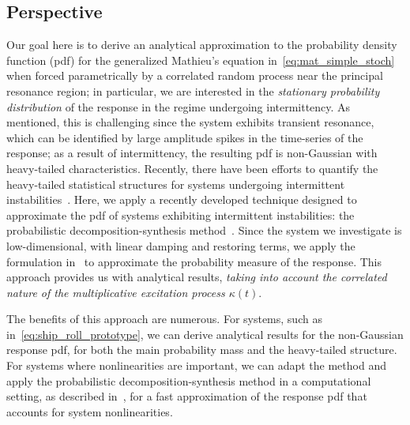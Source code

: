 \documentclass[3p]{elsarticle}
\begin{document}
\subsection{Perspective}
Our goal here is to derive an analytical approximation to the probability density function (pdf) for the generalized Mathieu's equation in~\cref{eq:mat_simple_stoch} when forced parametrically by a correlated random process near the principal resonance region; in particular, we are interested in   the \emph{stationary probability distribution} of the response in the regime undergoing intermittency. As mentioned, this is   challenging since the system exhibits transient  resonance, which can be identified by large amplitude spikes in the time-series of the response; as a result of intermittency, the resulting pdf is non-Gaussian with heavy-tailed characteristics.  Recently, there have been efforts to quantify the heavy-tailed statistical structures for systems undergoing intermittent instabilities~\cite{mohamad2015,mohamad2016, tong15,qi15}. Here,   we apply a recently developed technique  designed to  approximate the pdf of systems exhibiting intermittent instabilities:   the probabilistic decomposition-synthesis method~\cite{mohamad2016,mohamad2015}. Since the system we investigate is low-dimensional, with linear damping and restoring terms,  we  apply the formulation in~\cite{mohamad2015} to approximate the probability  measure of the response. This approach provides us with analytical results, \emph{taking into account the   correlated nature of the multiplicative excitation process $\kappa(t)$}. 

The benefits of this approach are numerous. For  systems, such as in~\cref{eq:ship_roll_prototype}, we can derive analytical results for the  non-Gaussian response pdf,   for both the main probability mass and the heavy-tailed structure.   For systems where nonlinearities are important, we can adapt the method and  apply the  probabilistic decomposition-synthesis method in a computational setting, as described in~\cite{mohamad2016}, for a fast approximation of the response pdf that  accounts for system nonlinearities. 
\end{document}
